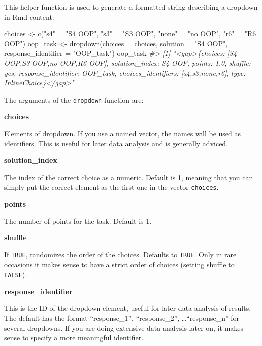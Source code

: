 \documentclass[twoside]{tufte-book}
\newenvironment{Shaded}{}{}
\newcommand{\AttributeTok}[1]{\textcolor[rgb]{0.49,0.56,0.16}{#1}}
\newcommand{\CommentTok}[1]{\textcolor[rgb]{0.38,0.63,0.69}{\textit{#1}}}
\newcommand{\FunctionTok}[1]{\textcolor[rgb]{0.02,0.16,0.49}{#1}}
\newcommand{\NormalTok}[1]{#1}
\newcommand{\OtherTok}[1]{\textcolor[rgb]{0.00,0.44,0.13}{#1}}
\newcommand{\StringTok}[1]{\textcolor[rgb]{0.25,0.44,0.63}{#1}}
\begin{document}
This helper function is used to generate a formatted string describing a dropdown in Rmd content:

\begin{Shaded}
\begin{Highlighting}[]
\NormalTok{choices }\OtherTok{\textless{}{-}} \FunctionTok{c}\NormalTok{(}\StringTok{"s4"} \OtherTok{=} \StringTok{"S4 OOP"}\NormalTok{, }\StringTok{"s3"} \OtherTok{=} \StringTok{"S3 OOP"}\NormalTok{, }\StringTok{"none"} \OtherTok{=} \StringTok{"no OOP"}\NormalTok{, }\StringTok{"r6"} \OtherTok{=} \StringTok{"R6 OOP"}\NormalTok{)}
\NormalTok{oop\_task }\OtherTok{\textless{}{-}} \FunctionTok{dropdown}\NormalTok{(}\AttributeTok{choices =}\NormalTok{ choices, }\AttributeTok{solution =} \StringTok{"S4 OOP"}\NormalTok{,}
                     \AttributeTok{response\_identifier =} \StringTok{"OOP\_task"}\NormalTok{)}
\NormalTok{oop\_task}
\CommentTok{\#\textgreater{} [1] "\textless{}gap\textgreater{}\{choices: [S4 OOP,S3 OOP,no OOP,R6 OOP], solution\_index: S4 OOP, points: 1.0, shuffle: yes, response\_identifier: OOP\_task, choices\_identifiers: [s4,s3,none,r6], type: InlineChoice\}\textless{}/gap\textgreater{}"}
\end{Highlighting}
\end{Shaded}

The arguments of the \texttt{dropdown} function are:

\noindent\textbf{choices}\label{choices}

Elements of dropdown. If you use a named vector, the names will be used as identifiers. This is useful for later data analysis and is generally adviced.

\noindent\textbf{solution\_index}\label{solution_index}

The index of the correct choice as a numeric. Default is 1, meaning that you can simply put the correct element as the first one in the vector \texttt{choices}.

\noindent\textbf{points}\label{points-4}

The number of points for the task. Default is 1.

\noindent\textbf{shuffle}\label{shuffle-2}

If \texttt{TRUE}, randomizes the order of the choices. Defaults to \texttt{TRUE}. Only in rare occasions it makes sense to have a strict order of choices (setting shuffle to \texttt{FALSE}).

\noindent\textbf{response\_identifier}\label{response_identifier-2}

This is the ID of the dropdown-element, useful for later data analysis of results. The default has the format ``response\_1'', ``response\_2'', \ldots{}``response\_n'' for several dropdowns. If you are doing extensive data analysis later on, it makes sense to specify a more meaningful identifier.
\end{document}
